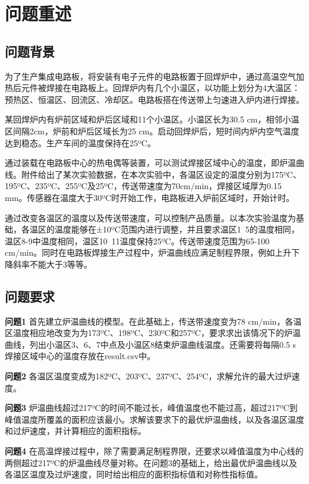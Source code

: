 \documentclass[withoutpreface,bwprint]{cumcmthesis} %
\begin{document}
	
	
	\section{问题重述}
	\subsection{问题背景}
	为了生产集成电路板，将安装有电子元件的电路板置于回焊炉中，通过高温空气加热后元件被焊接在电路板上。回焊炉内有几个小温区，以功能上划分为4大温区：预热区、恒温区、回流区、冷却区。电路板搭在传送带上匀速进入炉内进行焊接。
	
	某回焊炉内有炉前区域和炉后区域和11个小温区。小温区长为30.5 cm，相邻小温区间隔2cm，炉前和炉后区域长为25 cm。启动回焊炉后，短时间内炉内空气温度达到稳态。生产车间的温度保持在25ºC。
	
	通过装载在电路板中心的热电偶等装置，可以测试焊接区域中心的温度，即炉温曲线。附件给出了某次实验数据，在本次实验中，各温区设定的温度分别为175ºC、195ºC、235ºC、255ºC及25ºC，传送带速度为70cm/min，焊接区域厚为0.15 mm。传感器在温度大于30ºC时开始工作，电路板进入炉前区域时，开始计时。
	
	通过改变各温区的温度以及传送带速度，可以控制产品质量。以本次实验温度为基础，各温区的温度能够在±10ºC范围内进行调整，并且要求温区1~5的温度相同，温区8-9中温度相同，温区10~11温度保持25ºC。传送带速度范围为65-100 cm/min。同时在电路板焊接生产过程中，炉温曲线应满足制程界限，例如上升下降斜率不能大于3等等。
	\subsection{问题要求}
	
	\textbf{问题1}  首先建立炉温曲线的模型。在此基础上，传送带速度变为78 cm/min，各温区温度相应地改变为为173ºC、198ºC、230ºC和257ºC，要求求出该情况下的炉温曲线，列出小温区3、6、7中点及小温区8结束炉温曲线温度。还需要将每隔0.5 s焊接区域中心的温度存放在result.csv中。
	
	\textbf{问题2}  各温区温度变成为182ºC、203ºC、237ºC、254ºC，求解允许的最大过炉速度。
	
	\textbf{问题3} 炉温曲线超过217ºC的时间不能过长，峰值温度也不能过高，超过217ºC到峰值温度所覆盖的面积应该最小。求解该要求下的最优炉温曲线，以及各温区温度和过炉速度，并计算相应的面积指标。
	
	
	\textbf{问题4}  在高温焊接过程中，除了需要满足制程界限，还要求以峰值温度为中心线的两侧超过217ºC的炉温曲线尽量对称。在问题3的基础上，给出最优炉温曲线以及各温区温度及过炉速度，同时给出相应的面积指标值和对称性指标值。
	
\end{document}
